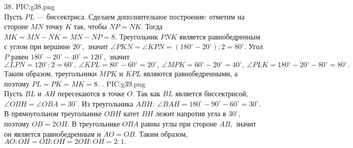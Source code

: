38. {{PIC:g38.png}}\\
Пусть $PL$ --- биссектриса. Сделаем дополнительное построение: отметим на стороне $MN$ точку $K$ так, чтобы $NP=NK.$ Тогда $MK=MN-NK=MN-NP=8.$ Треугольник $PNK$ является равнобедренным с углом при вершине $20^\circ,$ значит $\angle PKN=\angle KPN=(180^\circ-20^\circ):2=80^\circ.$ Угол $P$ равен $180^\circ-20^\circ-40^\circ=120^\circ,$ значит $\angle LPN=120^\circ:2=60^\circ,\ \angle KPL=80^\circ-60^\circ=20^\circ,\ \angle MPK=60^\circ-20^\circ=40^\circ,\ \angle PLK=180^\circ-20^\circ-80^\circ=80^\circ.$ Таким образом, треугольники $MPK$ и $KPL$ являются равнобедренными, а поэтому $PL=PK=MK=8.$\newpage
{}. {{PIC:g39.png}}\\
Пусть $BL$ и $AH$ пересекаются в точке $O.$ Так как $BL$ является биссектрисой, $\angle OBH=\angle OBA=30^\circ.$ Из треугольника $ABH:\ \angle BAH=180^\circ-90^\circ-60^\circ=30^\circ.$ В прямоугольном треугольнике $OBH$ катет $BH$ лежит напротив угла в $30^\circ,$ поэтому $OB=2OH.$ В треугольнике $OBA$ равны углы при стороне $AB,$ значит он является равнобедренным и $AO=OB.$ Таким образом, $AO:OH=OB:OH=2OH:OH=2:1.$\\
